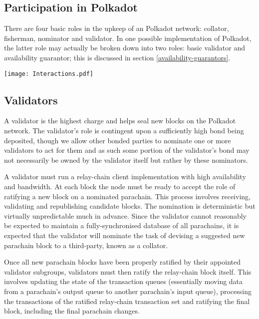 \documentclass[9pt,oneside]{amsart}
\newenvironment{Figure}
  {\par\medskip\noindent\minipage{\linewidth}}
  {\endminipage\par\medskip}
\begin{document}
\begin{multicols}{2}
\section{Participation in Polkadot}
\label{participation-in-disparity}

There are four basic roles in the upkeep of an Polkadot network: collator, fisherman, nominator and validator. In one possible implementation of Polkadot, the latter role may actually be broken down into two roles: basic validator and availability guarantor; this is discussed in section \ref{availability-guarantors}.

\begin{Figure}
\medskip
\centering
\texttt{[image: Interactions.pdf]}
\medskip
\end{Figure}

\subsection{Validators}
\label{validators}

 A validator is the highest charge and helps seal new blocks on the Polkadot network. The validator's role is contingent upon a sufficiently high bond being deposited, though we allow other bonded parties to nominate one or more validators to act for them and as such some portion of the validator's bond may not necessarily be owned by the validator itself but rather by these nominators.

 A validator must run a relay-chain client implementation with high availability and bandwidth. At each block the node must be ready to accept the role of ratifying a new block on a nominated parachain. This process involves receiving, validating and republishing candidate blocks. The nomination is deterministic but virtually unpredictable much in advance. Since the validator cannot reasonably be expected to maintain a fully-synchronised database of all parachains, it is expected that the validator will nominate the task of devising a suggested new parachain block to a third-party, known as a collator.

 Once all new parachain blocks have been properly ratified by their appointed validator subgroups, validators must then ratify the relay-chain block itself. This involves updating the state of the transaction queues (essentially moving data from a parachain's output queue to another parachain's input queue), processing the transactions of the ratified relay-chain transaction set and ratifying the final block, including the final parachain changes.


\end{multicols}
\end{document}
